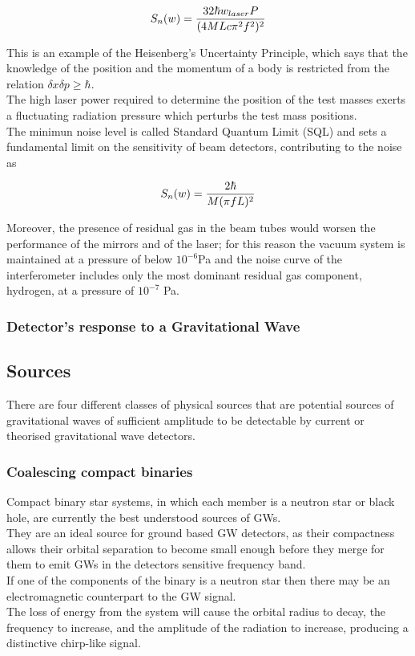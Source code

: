 \documentclass[binding=0.6cm, LaM]{sapthesis}
\begin{document}
		\begin{equation}
		S_n(w) =  {{32 \hbar w_{laser}P} \over {(4MLc \pi^2 f^2)^2}}
		\end{equation}

	This is an example of the Heisenberg’s Uncertainty Principle, which says that the knowledge 
	of the position and the momentum of a body is restricted from the relation $\delta x \delta p \geq \hbar$. \\
	The high laser power required to determine the position of the test masses exerts 
	a fluctuating radiation pressure which perturbs the test mass positions. \\ 
	The minimun noise level is called Standard Quantum Limit (SQL) and sets a fundamental limit 
	on the sensitivity of beam detectors, contributing to the noise as 

		\begin{equation}
		S_n(w) = {{2 \hbar} \over {M(\pi f L)^2}}
		\end{equation}

	Moreover, the presence of residual gas in the beam tubes would worsen the performance 
	of the mirrors and of the laser; for this reason the vacuum system is maintained at a pressure 
	of below $10^{-6}$Pa and the noise curve of the interferometer includes only 
	the most dominant residual gas component, hydrogen, at a pressure of $10^{−7}$ Pa. \\ 


\subsubsection{Detector’s response to a Gravitational Wave}

\subsection{Sources}

	There are four different classes of physical sources 
	that are potential sources of gravitational waves 
	of sufficient amplitude to be detectable 
	by current or theorised gravitational wave detectors. 

\subsubsection{Coalescing compact binaries}

	Compact binary star systems, in which each member is a neutron star or black hole, 
	are currently the best understood sources of GWs. \\
	They are an ideal source for ground based GW detectors, 
	as their compactness allows their orbital separation to become 
	small enough before they merge for them to emit GWs in the detectors sensitive frequency band. \\
	If one of the components of the binary is a neutron star 
	then there may be an electromagnetic counterpart to the GW signal. \\
	The loss of energy from the system will cause the orbital radius to decay, 
	the frequency to increase, and the amplitude of the radiation to increase, 
	producing a distinctive chirp-like signal. 
	
\end{document}

